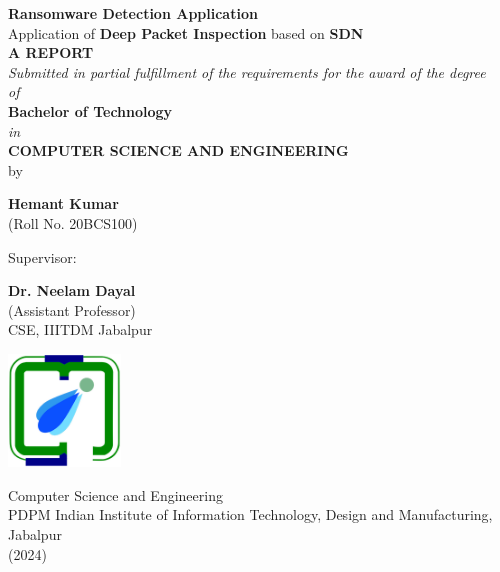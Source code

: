 \documentclass[12pt,letterpaper]{article}
\begin{document}
\begin{titlepage}
    \begin{center}
        
        \textbf{\LARGE Ransomware Detection Application} \\ \LARGE Application of \textbf{Deep Packet Inspection} based on \textbf{SDN} \\
         \large {\textbf{A REPORT} \\ \textit{Submitted in partial fulfillment of the requirements for the award of the degree \\ of}
        \\ \textbf{Bachelor of Technology} \\ \textit{in} \\ \textbf{COMPUTER SCIENCE AND ENGINEERING}} \\
        
        \Large by
        
        \textbf{\Large Hemant Kumar} \\
        (Roll No. 20BCS100)
        
        \vspace{0.8cm}
        
        \Large Supervisor:
        
        \textbf{\Large Dr. Neelam Dayal }\\
            (Assistant Professor) \\ CSE, IIITDM Jabalpur
        
        \vspace{0.8cm}
        
        
        
        \vfill
        
        \includegraphics[width=30mm]{images/logo_college copy.png}
        
        \vspace{0.5cm}
        
        \Large{Computer Science and Engineering 
        \\ PDPM Indian Institute of Information Technology, Design and Manufacturing, Jabalpur}
        \\ (2024)
        
    \end{center}
\end{titlepage}
\end{document}
